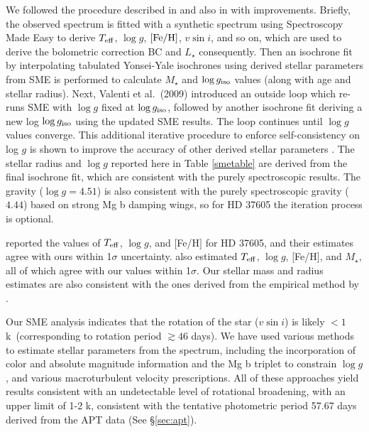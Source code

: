 We followed the procedure described in \cite{valentifischer2005} and
also in \cite{2009ApJ...702..989V} with improvements. Briefly, the
observed spectrum is fitted with a synthetic spectrum using
Spectroscopy Made Easy \citep[SME; ][]{valentipiskunov1996} to derive
$T_{\rm eff}$, $\log{g}$, $[{\rm Fe/H}]$, $v\sin{i}$, and so on, which
are used to derive the bolometric correction BC and $L_\star$
consequently. Then an isochrone fit by interpolating tabulated
Yonsei-Yale isochrones \citep{2004ApJS..155..667D} using derived
stellar parameters from SME is performed to calculate $M_\star$ and
$\log{g_{\rm iso}}$ values (along with age and stellar radius). Next,
Valenti et al.~(2009) introduced an outside loop which re-runs SME
with $\log{g}$ fixed at $\log{g_{\rm iso}}$, followed by another
isochrone fit deriving a new log $\log{g_{\rm iso}}$ using the updated
SME results. The loop continues until $\log{g}$ values converge. This
additional iterative procedure to enforce self-consistency on log $g$
is shown to improve the accuracy of other derived stellar parameters
\citep{2009ApJ...702..989V}. The stellar radius and $\log{g}$ reported
here in Table \ref{smetable} are derived from the final isochrone fit,
which are consistent with the purely spectroscopic results. The
gravity ($\log{g} = 4.51$) is also consistent with the purely
spectroscopic gravity ($4.44$) based on strong Mg b damping wings, so
for HD 37605 the iteration process is optional.

\cite{cochran2004} reported the values of $T_{\rm eff}$, $\log{g}$,
and $[$Fe/H$]$ for HD 37605, and their estimates agree with ours
within 1$\sigma$ uncertainty. \cite{santos2005} also
estimated $T_{\rm eff}$, $\log{g}$, $[$Fe/H$]$, and $M_\star$, all of
which agree with our values within 1$\sigma$. Our stellar
mass and radius estimates are also consistent with the ones derived
from the empirical method by \cite{torres2010}.

Our SME analysis indicates that the rotation of the star ($v\sin{i}$)
is likely $< 1$ k\mps\ (corresponding to rotation period $\gtrsim 46$
days). We have used various methods to estimate stellar parameters
from the spectrum, including the incorporation of color and absolute
magnitude information and the Mg b triplet to constrain $\log{g}$, and
various macroturbulent velocity prescriptions.  All of these
approaches yield results consistent with an undetectable level of
rotational broadening, with an upper limit of 1-2 k\mps, consistent
with the tentative photometric period 57.67 days derived from the APT data (See
\S \ref{sec:apt}).



